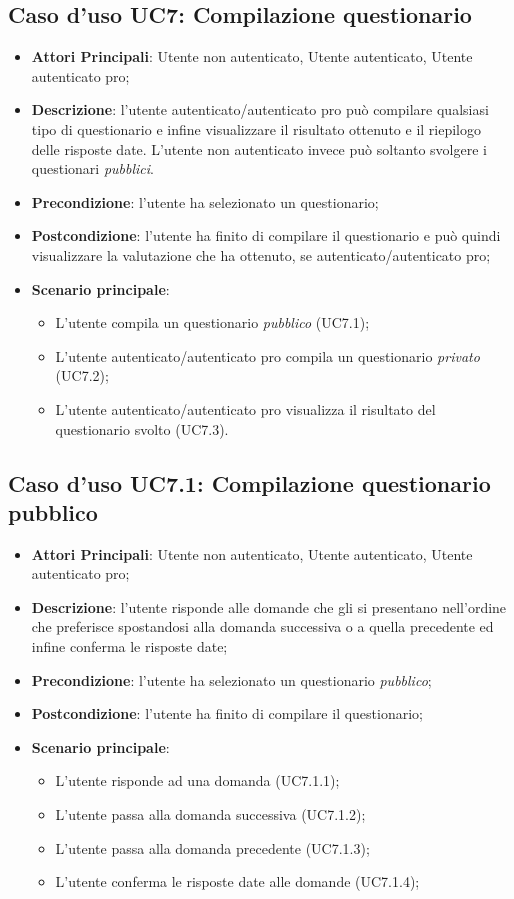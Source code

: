 \subsection{Caso d'uso UC7: Compilazione questionario}
\begin{itemize}
\item\textbf{Attori Principali}: Utente non autenticato, Utente autenticato, Utente autenticato pro;
\item\textbf{Descrizione}: l'utente autenticato/autenticato pro può compilare qualsiasi tipo di questionario e infine visualizzare il risultato ottenuto e il riepilogo delle risposte date. L'utente non autenticato invece può soltanto svolgere i questionari \textit{pubblici}.
\item\textbf{Precondizione}: l'utente ha selezionato un questionario;
\item\textbf{Postcondizione}: l'utente ha finito di compilare il questionario e può quindi visualizzare la valutazione che ha ottenuto, se autenticato/autenticato pro;
\item\textbf{Scenario principale}:
\begin{itemize}
\item L'utente compila un questionario \textit{pubblico} (UC7.1);
\item L'utente autenticato/autenticato pro compila un questionario \textit{privato} (UC7.2);
\item L'utente autenticato/autenticato pro visualizza il risultato del questionario svolto (UC7.3).
\end{itemize}
\end{itemize}

\subsection{Caso d'uso UC7.1: Compilazione questionario pubblico}
\begin{itemize}
\item\textbf{Attori Principali}: Utente non autenticato, Utente autenticato, Utente autenticato pro;
\item\textbf{Descrizione}: l'utente risponde alle domande che gli si presentano nell'ordine che preferisce spostandosi alla domanda successiva o a quella precedente ed infine conferma le risposte date;
\item\textbf{Precondizione}: l'utente ha selezionato un questionario \textit{pubblico};
\item\textbf{Postcondizione}: l'utente ha finito di compilare il questionario;
\item\textbf{Scenario principale}:
\begin{itemize}
\item L'utente risponde ad una domanda (UC7.1.1);
\item L'utente passa alla domanda successiva (UC7.1.2);
\item L'utente passa alla domanda precedente (UC7.1.3);
\item L'utente conferma le risposte date alle domande (UC7.1.4);
\end{itemize}
\end{itemize}

